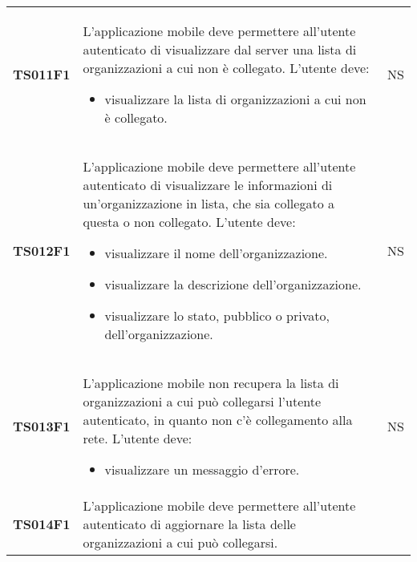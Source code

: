 \documentclass[../piano-di-qualifica.tex]{subfiles}
\begin{document}
\begin{longtable}[H]{>{\centering\bfseries}m{3cm} >{}m{10cm} >{\centering\arraybackslash}m{3cm}}
  TS011F1            & L'applicazione mobile deve permettere all'utente autenticato di visualizzare dal server una lista di organizzazioni a cui non è collegato. \newline
  L'utente deve:
  \begin{itemize}
    \item visualizzare la lista di organizzazioni a cui non è collegato.
  \end{itemize}
                     & NS                                                                                                                                                                                                                                                               \\
  TS012F1            & L'applicazione mobile deve permettere all'utente autenticato di visualizzare le informazioni di un'organizzazione in lista, che sia collegato a questa o non collegato. \newline
  L'utente deve:
  \begin{itemize}
    \item visualizzare il nome dell'organizzazione.
    \item visualizzare la descrizione dell'organizzazione.
    \item visualizzare lo stato, pubblico o privato, dell'organizzazione.
  \end{itemize}
                     & NS                                                                                                                                                                                                                                                               \\
  TS013F1            & L'applicazione mobile non recupera la lista di organizzazioni a cui può collegarsi l'utente autenticato, in quanto non c'è collegamento alla rete. \newline
  L'utente deve:
  \begin{itemize}
    \item visualizzare un messaggio d'errore.
  \end{itemize}
                     & NS                                                                                                                                                                                                                                                               \\
  TS014F1            & L'applicazione mobile deve permettere all'utente autenticato di aggiornare la lista delle organizzazioni a cui può collegarsi. \newline

\end{longtable}
\end{document}
